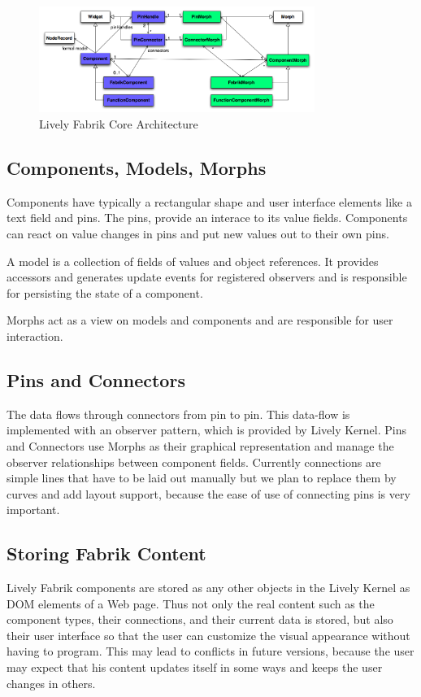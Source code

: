 \documentclass[pdftex, times, 10pt, twocolumn]{article}
\begin{document}
\begin{figure}[]\centering
\includegraphics[width=0.800000\textwidth]{LivelyFabrikCore.png} 

\caption{Lively Fabrik Core Architecture }
\label{fig:LivelyFabrikCore}
\end{figure}


\subsection{Components, Models, Morphs}
Components have typically a rectangular shape and user interface elements like a text field and pins.  The pins, provide an interace to its value fields. Components can react on value changes in pins and put new values out to their own pins.  

A model is a collection of fields of values and object references. It provides accessors and generates update events for registered observers and is responsible for persisting the state of a component. 

Morphs act as a view on models and components and are responsible for user interaction.  



\subsection{Pins and Connectors}
The data flows through connectors from pin to pin. This data-flow is implemented with an observer pattern, which is provided by Lively Kernel. Pins and Connectors use Morphs as their graphical representation and manage the observer relationships between component fields. Currently connections are simple lines that have to be laid out manually but we plan to replace them by curves and add layout support, because the ease of use of connecting pins is very important. 



\subsection{Storing Fabrik Content}
Lively Fabrik components are stored as any other objects in the Lively Kernel as DOM elements of a Web page. Thus not only the real content such as the component types, their connections, and their current data is stored, but also their user interface so that the user can customize the visual appearance without having to program. This may lead to conflicts in future versions, because the user may expect that his content updates itself in some ways and keeps the user changes in others.  
\end{document}
